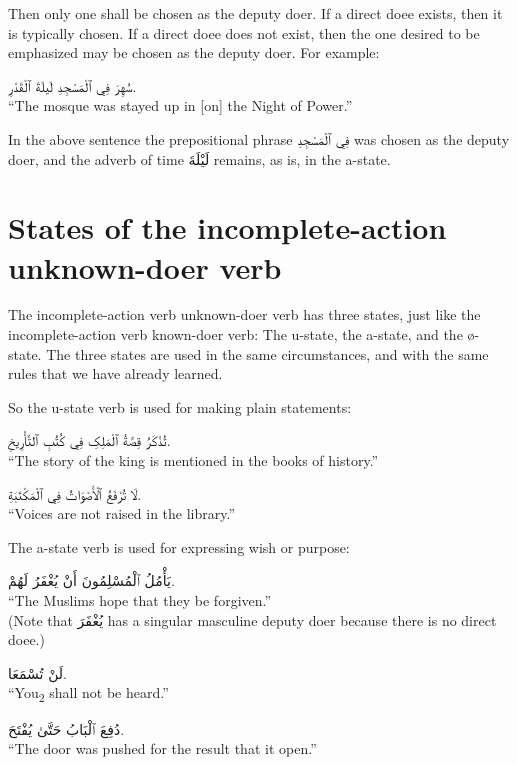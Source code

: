 \documentclass[
  10pt,
]{book}
\begin{document}
Then only one shall be chosen as the deputy doer. If a direct doee exists, then it is typically chosen. If a direct doee does not exist, then the one desired to be emphasized may be chosen as the deputy doer. For example:

\foreignlanguage{arabic}{سُهِرَ فِي ٱلْمَسْجِدِ لَيلَةَ ٱلْقَدْرِ.}\\
\enquote{The mosque was stayed up in {[}on{]} the Night of Power.}

In the above sentence the prepositional phrase \foreignlanguage{arabic}{فِي ٱلْمَسْجِدِ} was chosen as the deputy doer, and the adverb of time \foreignlanguage{arabic}{لَيْلَةَ} remains, as is, in the a-state.

\section{States of the incomplete-action unknown-doer verb}\label{states-of-the-incomplete-action-unknown-doer-verb}

The
incomplete-action verb unknown-doer verb
has three states, just like the
incomplete-action verb known-doer verb:
The u-state, the a-state, and the ø-state.
The three states are used in the same circumstances, and with the same rules that we have already learned.

So the u-state verb is used for making plain statements:

\foreignlanguage{arabic}{تُذْکَرُ قِصَّةُ ٱلْمَلِکِ فِي کُتُبِ ٱلتَّأْرِيخِ.}\\
\enquote{The story of the king is mentioned in the books of history.}

\foreignlanguage{arabic}{لَا تُرْفَعُ ٱلْأَصْوَاتُ فِي ٱلْمَکْتَبَةِ.}\\
\enquote{Voices are not raised in the library.}

The a-state verb is used for expressing wish or purpose:

\foreignlanguage{arabic}{يَأْمُلُ ٱلْمُسْلِمُونَ أَنْ يُغْفَرُ لَهُمْ.}\\
\enquote{The Muslims hope that they be forgiven.}\\
(Note that \foreignlanguage{arabic}{يُغْفَرَ} has a singular masculine deputy doer because there is no direct doee.)

\foreignlanguage{arabic}{لَنْ تُسْمَعَا.}\\
\enquote{You\textsubscript{2} shall not be heard.}

\foreignlanguage{arabic}{دُفِعَ ٱلْبَابُ حَتَّىٰ يُفْتَحَ.}\\
\enquote{The door was pushed for the result that it open.}
\end{document}
